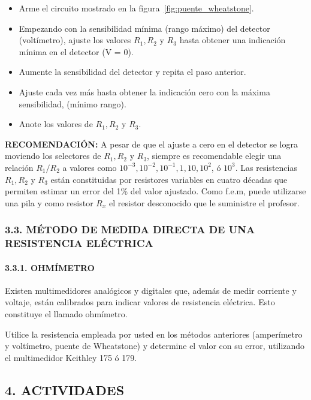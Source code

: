 \documentclass[12pt, a4paper]{article}
\begin{document}
\begin{itemize}
    \item Arme el circuito mostrado en la figura~\ref{fig:puente_wheatstone}.
    \item Empezando con la sensibilidad mínima (rango máximo) del detector (voltímetro), ajuste los valores $R_1, R_2$ y $R_3$ 
    hasta obtener una indicación mínima en el detector (V = 0).
    \item Aumente la sensibilidad del detector y repita el paso anterior.
    \item Ajuste cada vez más hasta obtener la indicación cero con la máxima sensibilidad, (mínimo rango).
    \item Anote los valores de $R_1, R_2$ y $R_3$.
\end{itemize}
\textbf{RECOMENDACIÓN:} A pesar de que el ajuste a cero en el detector se logra moviendo los selectores de $R_1, R_2$ y $R_3$, 
siempre es recomendable elegir una relación $R_1/R_2$ a valores como $10^{-3}, 10^{-2}, 10^{-1}, 1, 10, 10^2$, ó $10^3$. Las 
resistencias $R_1, R_2$ y $R_3$ están constituidas por resistores variables en cuatro décadas que permiten estimar un error del 
1\% del valor ajustado. Como f.e.m, puede utilizarse una pila y como resistor $R_x$ el resistor desconocido que le suministre 
el profesor.

\subsubsection*{3.3. MÉTODO DE MEDIDA DIRECTA DE UNA RESISTENCIA ELÉCTRICA}
\paragraph{3.3.1. OHMÍMETRO}
Existen multimedidores analógicos y digitales que, además de medir corriente y voltaje, están calibrados para indicar valores de 
resistencia eléctrica. Esto constituye el llamado ohmímetro.

Utilice la resistencia empleada por usted en los métodos anteriores (amperímetro y voltímetro, puente de Wheatstone) y determine el 
valor con su error, utilizando el multimedidor Keithley 175 ó 179.

\subsection*{4. ACTIVIDADES}
\end{document}
